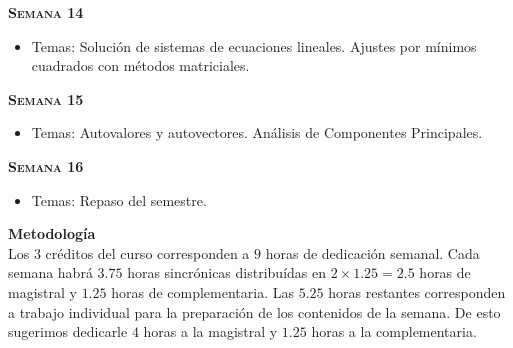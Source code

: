 \documentclass[letterpaper,10pt,onecolumn]{article}
\begin{document}
\noindent\textbf{\textsc{Semana 14}}\\[-0.5cm]
\begin{itemize}
\item Temas: Soluci\'on de sistemas de ecuaciones lineales. 
Ajustes por m\'inimos cuadrados con m\'etodos matriciales. 
\\[-0.6cm] 
\end{itemize}


\noindent\textbf{\textsc{Semana 15}}\\[-0.5cm]
\begin{itemize}
\item Temas: Autovalores y autovectores. An\'alisis de Componentes Principales. \\[-0.6cm]
\end{itemize}

\noindent\textbf{\textsc{Semana 16}}\\[-0.5cm]
\begin{itemize}
\item Temas: 
Repaso del semestre.
\\[-0.6cm]
\end{itemize}


\vspace*{0.5cm} 
\noindent\textbf{\large {} \quad
  Metodolog\'ia}\\[-0.2cm] 

Los $3$ cr\'editos del curso corresponden a $9$ horas de dedicaci\'on semanal.
Cada semana habr\'a $3.75$ horas sincr\'onicas distribu\'idas en $2\times 1.25=2.5$ horas de magistral 
y $1.25$ horas de complementaria. 
Las $5.25$ horas restantes corresponden a trabajo individual para la
preparaci\'on de los contenidos de la semana.
De esto sugerimos dedicarle $4$ horas a la magistral y $1.25$ horas a
la complementaria.
\end{document}
